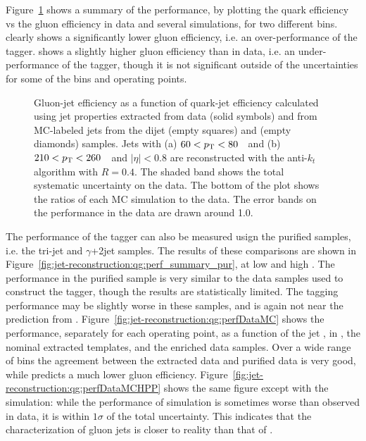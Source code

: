 Figure~\ref{fig:jet-reconstruction:qg:perf_summary} shows a summary of the performance, by plotting the quark efficiency vs the gluon efficiency in data and several simulations, for two different \pt bins. \Pythia clearly shows a significantly lower gluon efficiency, i.e. an over-performance of the tagger. \Herwigpp shows a slightly higher gluon efficiency than in data, i.e. an under-performance of the tagger, though it is not significant outside of the uncertainties for some of the \pt bins and operating points.

\begin{figure}[!htp]
\begin{center}
\caption{ Gluon-jet efficiency as a function of quark-jet efficiency calculated using jet 
properties extracted from data (solid symbols) and from MC-labeled jets
from the dijet \Pythia (empty squares) and \Herwigpp (empty diamonds) samples. 
Jets with (a) $60<p_{\text{T}}<80$~\GeV\ and (b) $210<p_{\text{T}}<260$~\GeV\  and $|\eta|<0.8$
are reconstructed with the anti-$k_t$ algorithm with $R=0.4$.
The shaded band shows the total systematic uncertainty on the data. The bottom of the plot
shows the ratios of each MC simulation to the data. The error bands on the performance
in the data are drawn around 1.0. 
}
\label{fig:jet-reconstruction:qg:perf_summary}
\end{center}
\end{figure}

The performance of the tagger can also be measured usign the purified samples, i.e. the tri-jet and $\gamma$+2jet samples. The results of these comparisons are shown in Figure~\ref{fig:jet-reconstruction:qg:perf_summary_pur}, at low \pt and high \pt. The performance in the purified sample is very similar to the data samples used to construct the tagger, though the results are statistically limited. The tagging performance may be slightly worse in these samples, and is again not near the prediction from \Pythia. Figure~\ref{fig:jet-reconstruction:qg:perfDataMC} shows the performance, separately for each operating point, as a function of the jet \pt, in \Pythia, the nominal extracted templates, and the enriched data samples. Over a wide range of \pt bins the agreement between the extracted data and purified data is very good, while \Pythia predicts a much lower gluon efficiency. Figure~\ref{fig:jet-reconstruction:qg:perfDataMCHPP} shows the same figure except with the \Herwigpp simulation: while the performance of simulation is sometimes worse than observed in data, it is within $1\sigma$ of the total uncertainty. This indicates that the \Herwigpp characterization of gluon jets is closer to reality than that of \Pythia.

